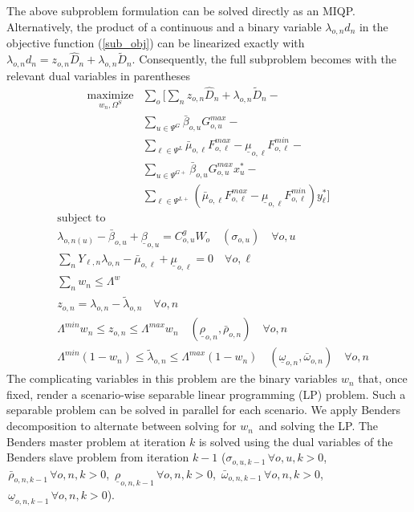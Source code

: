 The above subproblem formulation can be solved directly as an MIQP. Alternatively, the product of a continuous and a binary variable $\lambda_{o, n} d_n$ in the objective function (\ref{sub_obj}) can be linearized exactly with $\lambda_{o, n} d_n = z_{o, n} \hat{D}_n + \lambda_{o, n} \tilde{D}_n$. Consequently, the full subproblem becomes with the relevant dual variables in parentheses
\begin{align}
\label{sub_obj} \underset{w_n, \Omega^{S}}{\text{maximize}} &\sum\limits_o \Bigg[ \sum\limits_n z_{o, n} \hat{D}_n + \lambda_{o, n} \tilde{D}_n - \nonumber \\
&\sum\limits_{u \in \Psi^G} \bar{\beta}_{o,u} G_{o,u}^{max} - \nonumber \\
&\sum\limits_{\ell \in \Psi^L} \bar{\mu}_{o,\ell} F_{o,\ell}^{max} - \underline{\mu}_{o,\ell} F_{o,\ell}^{min} - \nonumber \\
&\sum\limits_{u \in \Psi^{G+}} \bar{\beta}_{o,u} G_{o,u}^{max} x_u^* - \nonumber \\
&\sum\limits_{\ell \in \Psi^{L+}} \left( \bar{\mu}_{o,\ell} F_{o,\ell}^{max} - \underline{\mu}_{o,\ell} F_{o,\ell}^{min} \right) y_\ell^* \Bigg]
\end{align}
\begin{align}
&\text{subject to} \nonumber \\
&\lambda_{o, n(u)} - \bar{\beta}_{o,u} + \underline{\beta}_{o,u} = C^g_{o,u} W_o \quad ( \sigma_{o, u} ) \quad \forall o, u \\
&\sum\limits_n Y_{\ell, n} \lambda_{o, n} - \bar{\mu}_{o, \ell} + \underline{\mu}_{o, \ell} = 0 \quad \forall o, \ell \\
&\sum\limits_n w_n \leq \Lambda^w \\
&z_{o,n} = \lambda_{o, n} - \tilde{\lambda}_{o, n} \quad \forall o, n \\
&\Lambda^{min} w_n \leq z_{o, n} \leq \Lambda^{max} w_n \quad (\underline{\rho}_{o, n}, \bar{\rho}_{o, n}) \quad \forall o,n \\
&\Lambda^{min} (1 - w_n) \leq \tilde{\lambda}_{o, n} \leq \Lambda^{max} (1 - w_n) \quad (\underline{\omega}_{o, n}, \bar{\omega}_{o, n}) \quad \forall o,n
\end{align}
The complicating variables in this problem are the binary variables $w_n$ that, once fixed, render a scenario-wise separable linear programming (LP) problem. Such a separable problem can be solved in parallel for each scenario. We apply Benders decomposition to alternate between solving for $w_n$ and solving the LP. The Benders master problem at iteration $k$ is solved using the dual variables of the Benders slave problem from iteration $k-1$ ($\sigma_{o, u, k-1} \, \forall o, u, k > 0$, $\, \bar{\rho}_{o, n, k-1} \, \forall o, n, k > 0$, $\, \underline{\rho}_{o, n, k-1} \, \forall o, n, k > 0$, $\, \bar{\omega}_{o, n, k-1} \, \forall o, n, k > 0$, $\, \underline{\omega}_{o, n, k-1} \, \forall o, n, k > 0$).

